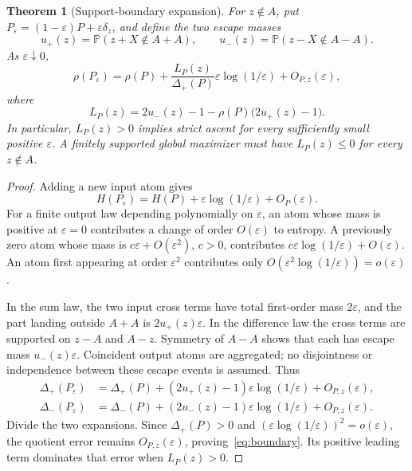 \documentclass[11pt]{article}
\newtheorem{theorem}{Theorem}[section]
\theoremstyle{remark}
\newcommand{\Prob}{\mathbb P}
\newcommand{\Dplus}{\Delta_+}
\newcommand{\Dminus}{\Delta_-}
\begin{document}
\begin{theorem}[Support-boundary expansion]\label{thm:boundary}
For $z\notin A$, put $P_\varepsilon=(1-\varepsilon)P+\varepsilon\delta_z$,
and define the two escape masses
\[
 u_+(z)=\Prob(z+X\notin A+A),\qquad
 u_-(z)=\Prob(z-X\notin A-A).
\]
As $\varepsilon\downarrow0$,
\begin{equation}\label{eq:boundary}
 \rho(P_\varepsilon)=\rho(P)+
 \frac{L_P(z)}{\Dplus(P)}\varepsilon\log(1/\varepsilon)
 +O_{P,z}(\varepsilon),
\end{equation}
where
\begin{equation}\label{eq:L}
 L_P(z)=2u_-(z)-1-\rho(P)\bigl(2u_+(z)-1\bigr).
\end{equation}
In particular, $L_P(z)>0$ implies strict ascent for every sufficiently
small positive $\varepsilon$. A finitely supported global maximizer must
have $L_P(z)\leq0$ for every $z\notin A$.
\end{theorem}
\begin{proof}
Adding a new input atom gives
\[
 H(P_\varepsilon)=H(P)+\varepsilon\log(1/\varepsilon)+O_P(\varepsilon).
\]
For a finite output law depending polynomially on $\varepsilon$, an atom
whose mass is positive at $\varepsilon=0$ contributes a change of order
$O(\varepsilon)$ to entropy. A previously zero atom whose mass is
$c\varepsilon+O(\varepsilon^2)$, $c>0$, contributes
$c\varepsilon\log(1/\varepsilon)+O(\varepsilon)$. An atom first appearing
at order $\varepsilon^2$ contributes only
$O(\varepsilon^2\log(1/\varepsilon))=o(\varepsilon)$.

In the sum law, the two input cross terms have total first-order mass
$2\varepsilon$, and the part landing outside $A+A$ is
$2u_+(z)\varepsilon$. In the difference law the cross terms are supported
on $z-A$ and $A-z$. Symmetry of $A-A$ shows that each has escape mass
$u_-(z)\varepsilon$. Coincident output atoms are aggregated; no
disjointness or independence between these escape events is assumed.
Thus
\begin{align*}
 \Dplus(P_\varepsilon)&=\Dplus(P)
 +(2u_+(z)-1)\varepsilon\log(1/\varepsilon)+O_{P,z}(\varepsilon),\\
 \Dminus(P_\varepsilon)&=\Dminus(P)
 +(2u_-(z)-1)\varepsilon\log(1/\varepsilon)+O_{P,z}(\varepsilon).
\end{align*}
Divide the two expansions. Since $\Dplus(P)>0$ and
$(\varepsilon\log(1/\varepsilon))^2=o(\varepsilon)$, the quotient error
remains $O_{P,z}(\varepsilon)$, proving~\eqref{eq:boundary}. Its positive
leading term dominates that error when $L_P(z)>0$.
\end{proof}
\end{document}
